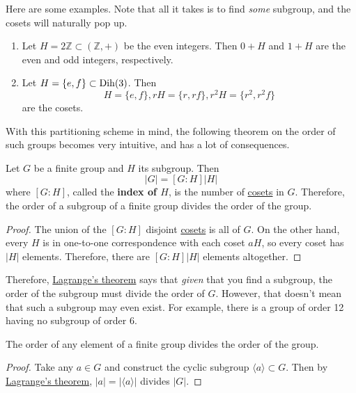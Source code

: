  \begin{example}
    \label{ex:familiar-cosets}
    Here are some examples. Note that all it takes is to find \textit{some} subgroup, and the cosets will naturally pop up. 
    \begin{enumerate}
      \item Let $H = 2 \mathbb{Z} \subset (\mathbb{Z}, +)$ be the even integers. Then $0 + H$ and $1 + H$ are the even and odd integers, respectively. 
      \item Let $H = \{e, f\} \subset \operatorname{Dih}(3)$. Then 
      \begin{equation}
        H = \{e, f\}, rH = \{r, rf\}, r^2 H = \{r^2, r^2 f\} 
      \end{equation}
      are the cosets. 
    \end{enumerate}
  \end{example}

  With this partitioning scheme in mind, the following theorem on the order of such groups becomes very intuitive, and has a lot of consequences. 

  \begin{theorem}
    \label{thm:lagranges-theorem}
    Let $G$ be a finite group and $H$ its subgroup. Then 
    \begin{equation}
      |G| = [G:H] |H|
    \end{equation}
    where $[G:H]$, called the \textbf{index of $H$}, is the number of \hyperref[def:coset]{cosets} in $G$. Therefore, the order of a subgroup of a finite group divides the order of the group. 
  \end{theorem}
  \begin{proof}
    The union of the $[G:H]$ disjoint \hyperref[def:coset]{cosets} is all of $G$. On the other hand, every $H$ is in one-to-one correspondence with each coset $aH$, so every coset has $|H|$ elements. Therefore, there are $[G:H] |H|$ elements altogether. 
  \end{proof}

  Therefore, \hyperref[thm:lagranges-theorem]{Lagrange's theorem} says that \textit{given} that you find a subgroup, the order of the subgroup must divide the order of $G$. However, that doesn't mean that such a subgroup may even exist. For example, there is a group of order 12 having no subgroup of order 6. 

  \begin{corollary}
    \label{thm:order-of-an-element-divides-the-group-order}
    The order of any element of a finite group divides the order of the group. 
  \end{corollary}
  \begin{proof}
    Take any $a \in G$ and construct the cyclic subgroup $\langle a \rangle \subset G$. Then by \hyperref[thm:lagranges-theorem]{Lagrange's theorem}, $|a| = |\langle a \rangle|$ divides $|G|$. 
  \end{proof}

